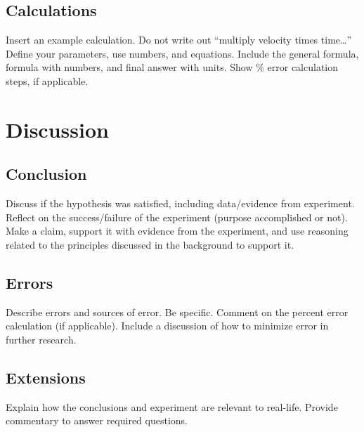 \documentclass[stu,biblatex,floatsintext,draftall]{apa7}
\begin{document}
\subsection{Calculations}
Insert an example calculation.  Do not write out “multiply velocity times time…”  Define your parameters, use numbers, and equations. Include the general formula, formula with numbers, and final answer with units. Show \% error calculation steps, if applicable.

\section{Discussion}

\subsection{Conclusion}
Discuss if the hypothesis was satisfied, including data/evidence from experiment. Reflect on the success/failure of the experiment (purpose accomplished or not). Make a claim, support it with evidence from the experiment, and use reasoning related to the principles discussed in the background to support it.

\subsection{Errors}
Describe errors and sources of error. Be specific. Comment on the percent error calculation (if applicable).  Include a discussion of how to minimize error in further research. 

\subsection{Extensions}
Explain how the conclusions and experiment are relevant to real-life.  Provide commentary to answer required questions. 

\printbibliography
\end{document}
